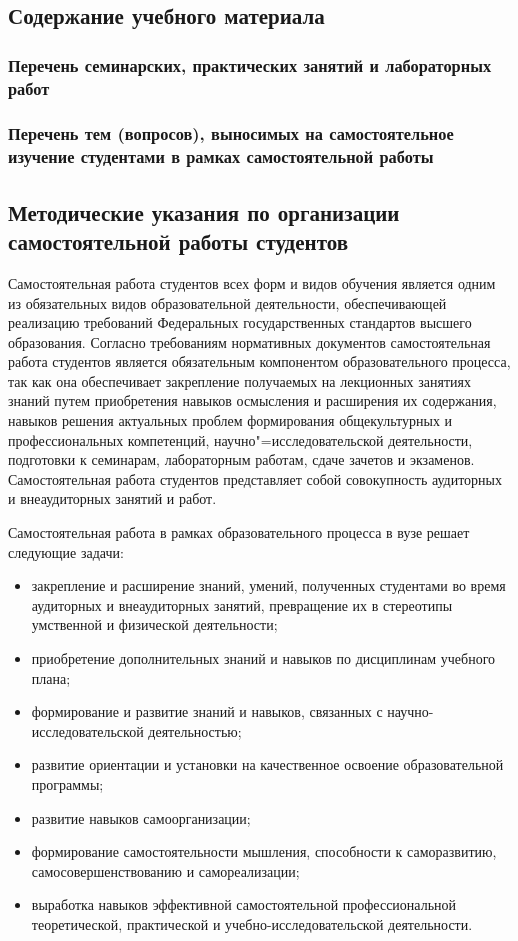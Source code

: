 \documentclass[12pt]{scrartcl}
\begin{document}
\subsection{Содержание учебного материала}

\subsubsection{Перечень семинарских, практических занятий и лабораторных работ}

\subsubsection{Перечень тем (вопросов), выносимых на самостоятельное изучение студентами
в рамках самостоятельной работы}

\subsection{Методические указания по организации самостоятельной работы студентов}

Самостоятельная работа студентов всех форм и видов обучения является одним из
обязательных видов образовательной деятельности, обеспечивающей реализацию
требований Федеральных государственных стандартов высшего образования. Согласно
требованиям нормативных документов самостоятельная работа студентов является
обязательным компонентом образовательного процесса, так как она обеспечивает
закрепление получаемых на лекционных занятиях знаний путем приобретения навыков
осмысления и расширения их содержания, навыков решения актуальных проблем
формирования общекультурных и профессиональных компетенций, научно"=исследовательской деятельности, подготовки к семинарам, лабораторным работам, сдаче зачетов и экзаменов. Самостоятельная работа студентов представляет собой совокупность
аудиторных и внеаудиторных занятий и работ.

Самостоятельная работа в рамках
образовательного процесса в вузе решает следующие задачи:
\begin{itemize}
\item закрепление и расширение знаний, умений, полученных студентами во время
аудиторных и внеаудиторных занятий, превращение их в стереотипы умственной и
физической деятельности;
\item приобретение дополнительных знаний и навыков по дисциплинам учебного плана;
\item формирование и развитие знаний и навыков, связанных с научно-исследовательской
деятельностью;
\item развитие ориентации и установки на качественное освоение образовательной
программы;
\item развитие навыков самоорганизации;
\item формирование самостоятельности мышления, способности к саморазвитию,
самосовершенствованию и самореализации;
\item выработка навыков эффективной самостоятельной профессиональной теоретической,
  практической и учебно-исследовательской деятельности.
\end{itemize}
\end{document}
